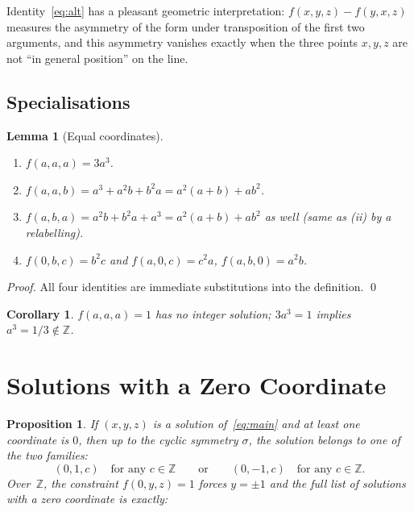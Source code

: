 \documentclass[12pt,a4paper]{article}
\newtheorem{lemma}[theorem]{Lemma}
\newtheorem{corollary}[theorem]{Corollary}
\newtheorem{proposition}[theorem]{Proposition}
\theoremstyle{definition}
\newcommand{\Z}{\mathbb{Z}}
\begin{document}
Identity~\eqref{eq:alt} has a pleasant geometric interpretation:
$f(x,y,z) - f(y,x,z)$ measures the asymmetry of the form under
transposition of the first two arguments, and this asymmetry vanishes
exactly when the three points $x, y, z$ are not ``in general position''
on the line.

\subsection{Specialisations}

\begin{lemma}[Equal coordinates]\label{lem:equal}
  \begin{enumerate}[label=(\roman*)]
    \item $f(a,a,a) = 3a^3$.
    \item $f(a,a,b) = a^3 + a^2b + b^2a = a^2(a+b) + ab^2$.
    \item $f(a,b,a) = a^2b + b^2a + a^3 = a^2(a+b) + ab^2$ as well
          (same as (ii) by a relabelling).
    \item $f(0,b,c) = b^2c$ and $f(a,0,c) = c^2a$,
          $f(a,b,0) = a^2b$.
  \end{enumerate}
\end{lemma}

\begin{proof}
  All four identities are immediate substitutions into the definition. \qed
\end{proof}

\begin{corollary}
  $f(a,a,a) = 1$ has no integer solution; $3a^3=1$ implies
  $a^3 = 1/3 \notin\Z$.
\end{corollary}

\section{Solutions with a Zero Coordinate}\label{sec:zero}

\begin{proposition}\label{prop:zero}
  If $(x,y,z)$ is a solution of~\eqref{eq:main} and at least one
  coordinate is $0$, then up to the cyclic symmetry $\sigma$, the
  solution belongs to one of the two families:
  \[
    (0, 1, c)\quad\text{for any }c\in\Z
    \qquad\text{or}\qquad
    (0, -1, c)\quad\text{for any }c\in\Z.
  \]
  Over~$\Z$, the constraint $f(0,y,z)=1$ forces $y=\pm1$ and
  the full list of solutions with a zero coordinate is exactly:
\end{proposition}
\end{document}
